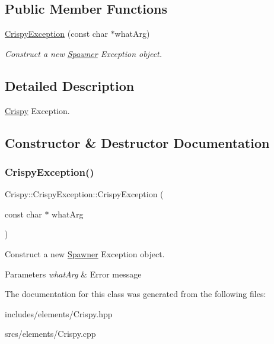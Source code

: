 \subsection*{Public Member Functions}
\begin{DoxyCompactItemize}
\item 
\hyperlink{class_crispy_1_1_crispy_exception_a08184b58b682cba4d9547befeafc3cc9}{Crispy\+Exception} (const char $\ast$what\+Arg)
\begin{DoxyCompactList}\small\item\em Construct a new \hyperlink{class_spawner}{Spawner} Exception object. \end{DoxyCompactList}\end{DoxyCompactItemize}


\subsection{Detailed Description}
\hyperlink{class_crispy}{Crispy} Exception. 

\subsection{Constructor \& Destructor Documentation}
\mbox{\label{class_crispy_1_1_crispy_exception_a08184b58b682cba4d9547befeafc3cc9}} 
\subsubsection{\texorpdfstring{Crispy\+Exception()}{CrispyException()}}
{\footnotesize\ttfamily Crispy\+::\+Crispy\+Exception\+::\+Crispy\+Exception (\begin{DoxyParamCaption}\item[{const char $\ast$}]{what\+Arg }\end{DoxyParamCaption})\hspace{0.3cm}{\ttfamily [explicit]}}



Construct a new \hyperlink{class_spawner}{Spawner} Exception object. 


\begin{DoxyParams}{Parameters}
{\em what\+Arg} & Error message \\
\hline
\end{DoxyParams}


The documentation for this class was generated from the following files\+:\begin{DoxyCompactItemize}
\item 
includes/elements/Crispy.\+hpp\item 
srcs/elements/Crispy.\+cpp\end{DoxyCompactItemize}
